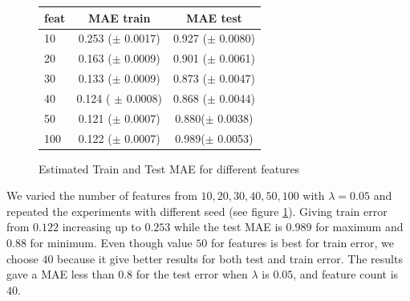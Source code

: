 \begin{figure}[h]
\begin{minipage}{\textwidth}
\begin{minipage}[b]{0.45\textwidth}
  \end{minipage}
  \hfill
  \begin{minipage}[b]{0.5\textwidth}
\begin{center}
  \begin{tabular}{ |l | c | c| }
    \hline
     feat & MAE train & MAE test \\ \hline
     10   & 0.253 ($\pm$  0.0017) &  0.927 ($\pm$ 0.0080) \\ \hline
     20  &  0.163 ($\pm$  0.0009) &  0.901 ($\pm$  0.0061) \\ \hline
     30     & 0.133 ($\pm$ 0.0009)  & 0.873 ($\pm$ 0.0047) \\ \hline
     40    & 0.124  ( $\pm$ 0.0008) & 0.868 ($\pm$  0.0044)\\ \hline
     50       & 0.121 ($\pm$ 0.0007) & 0.880($\pm$  0.0038)\\ \hline
     100    & 0.122 ($\pm$ 0.0007) & 0.989($\pm$  0.0053) \\
    \hline
  \end{tabular}
\end{center}
\vspace{10 mm}
    \end{minipage}
  \end{minipage}
  \caption{Estimated Train and Test MAE for different features}
  \label{fig:ALS_features}
\end{figure}
  
We varied the number of features from $10,20,30,40,50,100$ with $\lambda = 0.05$ and repeated the experiments with different seed (see figure \ref{fig:ALS_features}). Giving train error from $0.122$ increasing up to $0.253$ while the test MAE is $0.989$ for maximum and $0.88$ for minimum. Even though value $50$ for features is best for train error, we choose $40$ because it give better results for both test and train error. The results gave a MAE less than $0.8$ for the test error when $\lambda$ is $0.05$, and feature count is $40$.


